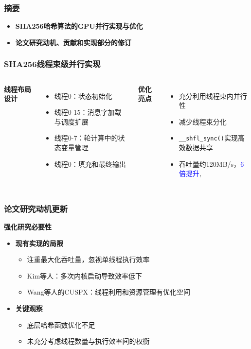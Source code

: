 \documentclass[slide]{../../custom}
\begin{document}
\begin{frame}
  \titlepage
\end{frame}

\begin{frame}
  \frametitle{摘要}
  \begin{itemize}
    \item \textbf{SHA256哈希算法的GPU并行实现与优化}
    \item \textbf{论文研究动机、贡献和实现部分的修订}
  \end{itemize}
\end{frame}

\begin{frame}
  \frametitle{SHA256线程束级并行实现}
  \begin{columns}
    \textbf{线程布局设计}
    \begin{itemize}
      \item 线程0：状态初始化
      \item 线程0-15：消息字加载与调度扩展
      \item 线程0-7：轮计算中的状态变量管理
      \item 线程0：填充和最终输出
    \end{itemize}

    \textbf{优化亮点}
    \begin{itemize}
      \item 充分利用线程束内并行性
      \item 减少线程束分化
      \item \texttt{\_\_shfl\_sync()}实现高效数据共享
      \item 吞吐量约120MB/s，\textcolor{blue}{6倍提升}, \cite{Wang2025}
    \end{itemize}
  \end{columns}
\end{frame}

\begin{frame}
  \frametitle{论文研究动机更新}
  \textbf{强化研究必要性}
  \begin{itemize}
    \item \textbf{现有实现的局限}
      \begin{itemize}
        \item 注重最大化吞吐量，忽视单线程执行效率
        \item Kim等人：多次内核启动导致效率低下
        \item Wang等人的CUSPX：线程利用和资源管理有优化空间
      \end{itemize}
    \item \textbf{关键观察}
      \begin{itemize}
        \item 底层哈希函数优化不足
        \item 未充分考虑线程数量与执行效率间的权衡
      \end{itemize}
  \end{itemize}
\end{frame}
\end{document}
